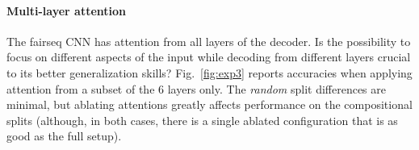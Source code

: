 

\paragraph{Multi-layer attention}
\label{subsec:exp3}

The fairseq CNN has attention from all layers of the
decoder. Is the possibility to focus on different aspects of the input
while decoding from different layers crucial to its better
generalization skills? Fig.~\ref{fig:exp3} reports
accuracies when applying attention from a subset of the 6
layers only. The \emph{random} split differences are minimal,
but ablating attentions greatly affects performance on the
compositional splits (although, in both cases, there is a single ablated
configuration that is as good as the full setup).

